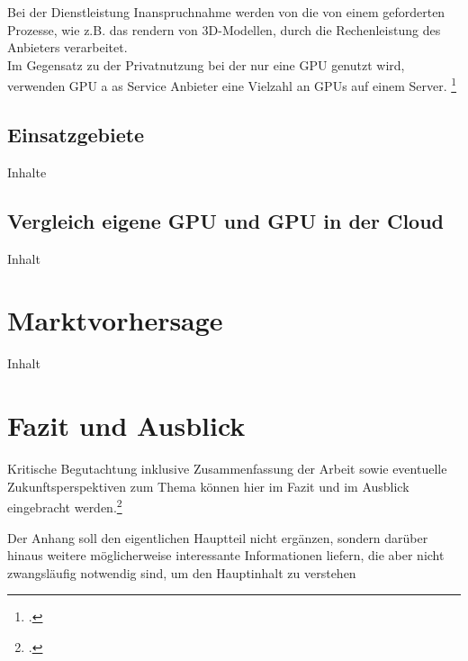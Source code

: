 \documentclass[12pt,toc=bib,toc=listof]{scrreprt}
\newcounter{savepage}
\begin{document}
Bei der Dienstleistung Inanspruchnahme werden von die von einem geforderten
Prozesse, wie z.B. das rendern von 3D-Modellen, durch die Rechenleistung des 
Anbieters verarbeitet.\\
Im Gegensatz zu der Privatnutzung bei der nur eine GPU genutzt wird, 
verwenden GPU a as Service Anbieter eine Vielzahl an GPUs auf einem Server. \footcite [] [] {Wang.2017}

\section{Einsatzgebiete}
\label{sec: Einsatzgebiete}

Inhalte

\section{Vergleich eigene GPU und GPU in der Cloud}
\label{sec:Vergleich eigene GPU und GPU in der Cloud}

Inhalt

\chapter{Marktvorhersage}
\label{sec:Marktvorhersage}

Inhalt

\chapter{Fazit und Ausblick} %
\label{sec:fazit}

Kritische Begutachtung inklusive Zusammenfassung der Arbeit sowie eventuelle Zukunftsperspektiven zum Thema können hier im Fazit und im Ausblick eingebracht werden.\footcite [Vgl.] [] {HAN2016S30}


\appendix
\newpage

\setcounter{page}{\thesavepage}

\label{sec:anhang}

Der Anhang soll den eigentlichen Hauptteil nicht ergänzen, sondern darüber hinaus weitere möglicherweise interessante Informationen liefern, die aber nicht zwangsläufig notwendig sind, um den Hauptinhalt zu verstehen

\newpage

\printbibliography[heading=head]
\end{document}
